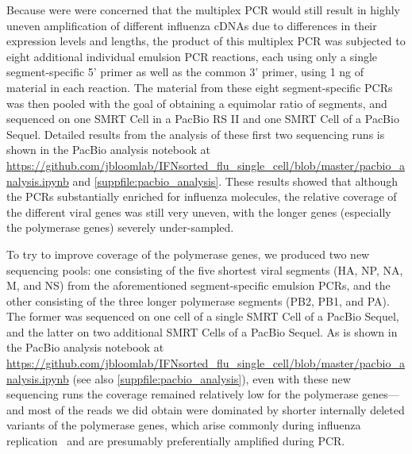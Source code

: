 \documentclass[10pt,letterpaper]{article}
\newcommand{\SUPPFILE}[1]{\autoref{suppfile:#1}}
\begin{document}
Because were were concerned that the multiplex PCR would still result in highly uneven amplification of different influenza cDNAs due to differences in their expression levels and lengths, the product of this multiplex PCR was subjected to eight additional individual emulsion PCR reactions, each using only a single segment-specific 5' primer as well as the common 3' primer, using 1 ng of material in each reaction.
The material from these eight segment-specific PCRs was then pooled with the goal of obtaining a equimolar ratio of segments, and sequenced on one SMRT Cell in a PacBio RS II and one SMRT Cell of a PacBio Sequel. 
Detailed results from the analysis of these first two sequencing runs is shown in the PacBio analysis notebook at \url{https://github.com/jbloomlab/IFNsorted_flu_single_cell/blob/master/pacbio_analysis.ipynb} and \SUPPFILE{pacbio_analysis}.
These results showed that although the PCRs substantially enriched for influenza molecules, the relative coverage of the different viral genes was still very uneven, with the longer genes (especially the polymerase genes) severely under-sampled.

To try to improve coverage of the polymerase genes, we produced two new sequencing pools: one consisting of the five shortest viral segments (HA, NP, NA, M, and NS) from the aforementioned segment-specific emulsion PCRs, and the other consisting of the three longer polymerase segments (PB2, PB1, and PA).
The former was sequenced on one cell of a single SMRT Cell of a PacBio Sequel, and the latter on two additional SMRT Cells of a PacBio Sequel. 
As is shown in the PacBio analysis notebook at \url{https://github.com/jbloomlab/IFNsorted_flu_single_cell/blob/master/pacbio_analysis.ipynb} (see also \SUPPFILE{pacbio_analysis}), even with these new sequencing runs the coverage remained relatively low for the polymerase genes---and most of the reads we did obtain were dominated by shorter internally deleted variants of the polymerase genes, which arise commonly during influenza replication~\citep{xue2016propagation} and are presumably preferentially amplified during PCR.
\end{document}
